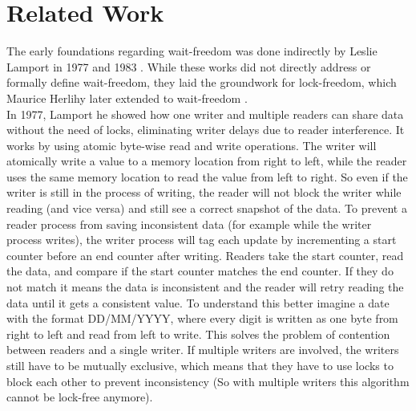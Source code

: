 \chapter{Related Work}\label{ch:related-work}

The early foundations regarding wait-freedom was done indirectly by Leslie Lamport in 1977 and 1983 \cite{Lamport1977ConcurrentReading,Lamport1983SPSCCircularBuffer}. While these works did not directly address or formally define wait-freedom, they laid the groundwork for lock-freedom, which Maurice Herlihy later extended to wait-freedom \cite{herlihy1991wait}. \\
In 1977, Lamport he showed how one writer and multiple readers can share data without the need of locks, eliminating writer delays due to reader interference. It works by using atomic byte-wise read and write operations. The writer will atomically write a value to a memory location from right to left, while the reader uses the same memory location to read the value from left to right. So even if the writer is still in the process of writing, the reader will not block the writer while reading (and vice versa) and still see a correct snapshot of the data. To prevent a reader process from saving inconsistent data (for example while the writer process writes), the writer process will tag each update by incrementing a start counter before an end counter after writing. Readers take the start counter, read the data, and compare if the start counter matches the end counter. If they do not match it means the data is inconsistent and the reader will retry reading the data until it gets a consistent value. To understand this better imagine a date with the format DD/MM/YYYY, where every digit is written as one byte from right to left and read from left to write. This solves the problem of contention between readers and a single writer. If multiple writers are involved, the writers still have to be mutually exclusive, which means that they have to use locks to block each other to prevent inconsistency (So with multiple writers this algorithm cannot be lock-free anymore). \cite{Lamport1977ConcurrentReading} 

